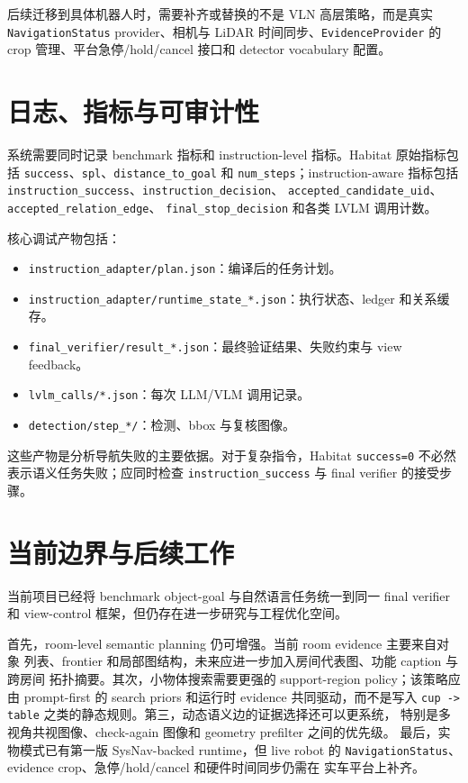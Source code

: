 \documentclass[UTF8,zihao=-4]{ctexart}
\begin{document}
后续迁移到具体机器人时，需要补齐或替换的不是 VLN 高层策略，而是真实
\texttt{NavigationStatus} provider、相机与 LiDAR 时间同步、\texttt{EvidenceProvider}
的 crop 管理、平台急停/hold/cancel 接口和 detector vocabulary 配置。

\section{日志、指标与可审计性}

系统需要同时记录 benchmark 指标和 instruction-level 指标。Habitat 原始指标包括
\texttt{success}、\texttt{spl}、\texttt{distance\_to\_goal} 和
\texttt{num\_steps}；instruction-aware 指标包括
\texttt{instruction\_success}、\texttt{instruction\_decision}、
\texttt{accepted\_candidate\_uid}、\texttt{accepted\_relation\_edge}、
\texttt{final\_stop\_decision} 和各类 LVLM 调用计数。

核心调试产物包括：

\begin{itemize}[leftmargin=1.5em]
  \item \texttt{instruction\_adapter/plan.json}：编译后的任务计划。
  \item \texttt{instruction\_adapter/runtime\_state\_*.json}：执行状态、ledger 和关系缓存。
  \item \texttt{final\_verifier/result\_*.json}：最终验证结果、失败约束与 view feedback。
  \item \texttt{lvlm\_calls/*.json}：每次 LLM/VLM 调用记录。
  \item \texttt{detection/step\_*/}：检测、bbox 与复核图像。
\end{itemize}

这些产物是分析导航失败的主要依据。对于复杂指令，Habitat
\texttt{success=0} 不必然表示语义任务失败；应同时检查
\texttt{instruction\_success} 与 final verifier 的接受步骤。

\section{当前边界与后续工作}

当前项目已经将 benchmark object-goal 与自然语言任务统一到同一 final verifier
和 view-control 框架，但仍存在进一步研究与工程优化空间。

首先，room-level semantic planning 仍可增强。当前 room evidence 主要来自对象
列表、frontier 和局部图结构，未来应进一步加入房间代表图、功能 caption 与跨房间
拓扑摘要。其次，小物体搜索需要更强的 support-region policy；该策略应由
prompt-first 的 search priors 和运行时 evidence 共同驱动，而不是写入
\texttt{cup -> table} 之类的静态规则。第三，动态语义边的证据选择还可以更系统，
特别是多视角共视图像、check-again 图像和 geometry prefilter 之间的优先级。
最后，实物模式已有第一版 SysNav-backed runtime，但 live robot 的
\texttt{NavigationStatus}、evidence crop、急停/hold/cancel 和硬件时间同步仍需在
实车平台上补齐。
\end{document}
